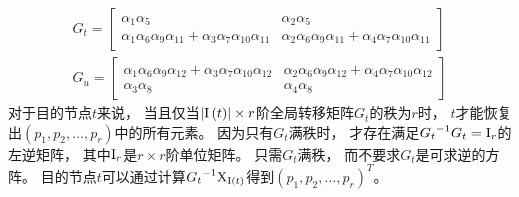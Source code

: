 \begin{frame}[t,allowframebreaks]
	\newpage
	\begin{eqnarray}\label{eq:quanjuzhuanyi}
	{G_t} = \left[ {\begin{array}{*{20}{c}}
		{{\alpha _1}{\alpha _5}}&{{\alpha _2}{\alpha _5}}\\
		{{\alpha _1}{\alpha _6}{\alpha _9}{\alpha _{11} }+{\alpha _3}{\alpha _7}{\alpha _{10}}{\alpha _{11} }}&{{\alpha _2}{\alpha _6}{\alpha _9}{\alpha _{11}}+{\alpha _4}{\alpha _7}{\alpha _{10}}{\alpha _{11}}}
		\end{array}} \right] \nonumber \\
	{G_u}= \left[ {\begin{array}{*{20}{c}}
		{{\alpha _1}{\alpha _6}{\alpha _9}{\alpha _{12} }+{\alpha _3}{\alpha _7}{\alpha _{10}}{\alpha _{12} }}&{{\alpha _2}{\alpha _6}{\alpha _9}{\alpha _{12}}+{\alpha _4}{\alpha _7}{\alpha _{10}}{\alpha _{12}}}\\
		{{\alpha _3}{\alpha _8}}&{{\alpha _4}{\alpha _8}}
		\end{array}} \right]
	\end{eqnarray}
	对于目的节点$t$来说，
	当且仅当$\left|{\rm I}\left(t\right)\right| \times r$阶全局转移矩阵$G_{t}$的秩为$r$时，
	$t$才能恢复出$\left(p_1,p_2,\dots,p_r\right)$中的所有元素。
	因为只有$G_t$满秩时，
	才存在满足${G_t}^{-1}G_t={\rm I}_r$的左逆矩阵，
	其中${\rm I}_r$是$r \times r$阶单位矩阵。
	只需$G_{t}$满秩，
	而不要求$G_{t}$是可求逆的方阵。
	目的节点$t$可以通过计算${G_t}^{-1}{\rm X}_{{\rm I}\left(t\right)}$得到$\left(p_1,p_2,\dots,p_r\right)^{T}$。

\end{frame}
